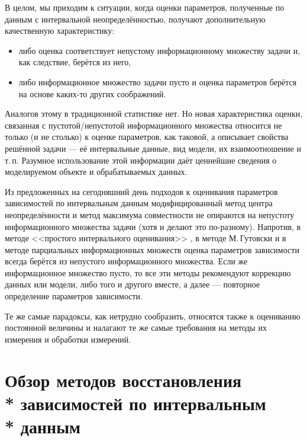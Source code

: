 \documentclass[a5paper,openany]{book}
\begin{document}
В целом, мы приходим к ситуации, когда оценки параметров, полученные по данным 
с интервальной неопределённостью, получают дополнительную качественную характеристику: 
\begin{itemize} 
\item 
либо оценка соответствует непустому информационному множеству задачи 
и, как следствие, берётся из него,  
\item 
либо информационное множество задачи пусто и оценка параметров берётся на основе 
каких-то других соображений. 
\end{itemize} 
Аналогов этому в традиционной статистике нет. Но новая характеристика оценки, 
связанная с пустотой/непустотой информационного множества относится не только 
(и не столько) к оценке параметров, как таковой, а описывает свойства решённой 
задачи --- её интервальные данные, вид модели, их взаимоотношение и т.\,п. 
Разумное использование этой информации даёт ценнейшие сведения о моделируемом 
объекте и обрабатываемых данных. 
  
Из предложенных на сегодняшний день подходов к оценивания параметров зависимостей 
по интервальным данным модифицированный метод центра неопределённости \cite{ZhilinDiss} 
и метод максимума совместности \cite{SShary2012, SSharyJCT2017, SSharyIzvAN2017, 
SSharyPLab2020, SSharyADSAA} не опираются на непустоту информационного множества 
задачи (хотя и делают это по-разному). Напротив, в методе <<простого интервального 
оценивания>> \cite{Rodionova}, в методе М.\,Гутовски \cite{Gutowski} и в методе 
парциальных информационных множеств \cite{Kumkov2010, Kumkov2013} оценка параметров 
зависимости всегда берётся из непустого информационного множества. Если же информационное 
множество пусто, то все эти методы рекомендуют коррекцию данных или модели, либо того 
и другого вместе, а далее --- повторное определение параметров зависимости. 
  
Те же самые парадоксы, как нетрудно сообразить, относятся также к оцениванию 
постоянной величины и налагают те же самые требования на методы их измерения и 
обработки измерений. 
  
  
  
\section[Обзор методов восстановления зависимостей\\* по интервальным данным]%
        {Обзор методов восстановления \\* зависимостей по интервальным\\* данным} 
\label{SurveyMethodSect} 
\end{document}

